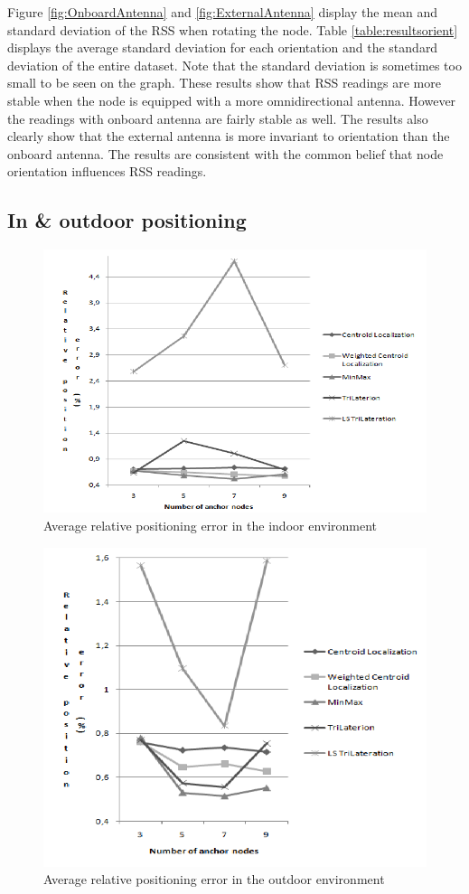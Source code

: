 Figure \ref{fig:OnboardAntenna} and \ref{fig:ExternalAntenna} display the mean and standard deviation of the RSS when rotating the node. Table \ref{table:resultsorient} displays the average standard deviation for each orientation and the standard deviation of the entire dataset. Note that the standard deviation is sometimes too small to be seen on the graph. These results show that RSS readings are more stable when the node is equipped with a more omnidirectional antenna. However the readings with onboard antenna are fairly stable as well. The results also clearly show that the external antenna is more invariant to orientation than the onboard antenna. 
The results are consistent with the common belief that node orientation influences RSS readings.

\subsection{In \& outdoor positioning}
\begin{figure}[h]
	\centering
		\includegraphics[scale=0.35]{Images/IndoorAccuracy.png}
	\caption{Average relative positioning error in the indoor environment}
	\label{fig:IndoorAccuracy}
\end{figure}

\begin{figure}[h]
	\centering
		\includegraphics[scale=0.35]{Images/OutdoorAccuracy.png}
	\caption{Average relative positioning error in the outdoor environment}
	\label{fig:OutdoorAccuracy}
\end{figure}